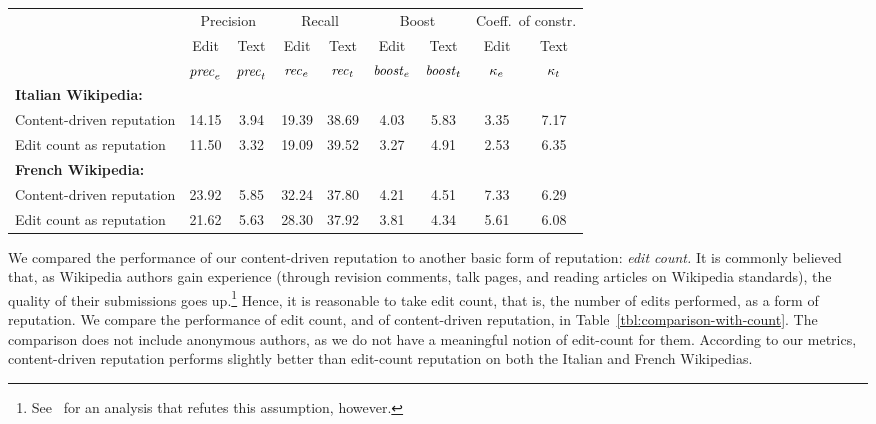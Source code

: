 \begin{sidewaystable}
\begin{center}
\begin{tabular}{|l||c|c||c|c||c|c||c|c|} \hline
 & \multicolumn{2}{|c||}{Precision}
 & \multicolumn{2}{|c||}{Recall}
 & \multicolumn{2}{|c||}{Boost}
 & \multicolumn{2}{|c|}{Coeff.\ of constr.} \\
 & Edit & Text & Edit & Text  & Edit & Text & Edit & Text \\
 & ${\text{\textit{prec}}}_e$ & ${\text{\textit{prec}}}_t$ & ${\text{\textit{rec}}}_e$ & ${\text{\textit{rec}}}_t$ & ${\text{\textit{boost}}}_e$ & ${\text{\textit{boost}}}_t$
 & $\kappa_e$ & $\kappa_t$ \\[0.5ex] \hline
\textbf{Italian Wikipedia:} & & & & & & & & \\
\qquad Content-driven reputation & 14.15 &  3.94 & 19.39 & 38.69 & 4.03 & 5.83 & 3.35 & 7.17 \\
\qquad Edit count as reputation  & 11.50 &  3.32 & 19.09 & 39.52 & 3.27 & 4.91 & 2.53 & 6.35 \\ \hline
\textbf{French Wikipedia:} & & & & & & & & \\
\qquad Content-driven reputation & 23.92 &  5.85 & 32.24 & 37.80 & 4.21 & 4.51 & 7.33 & 6.29 \\
\qquad Edit count as reputation &  21.62 &  5.63 & 28.30 & 37.92 & 3.81 & 4.34 & 5.61 & 6.08 \\ \hline
\end{tabular}
\end{center}
\caption[Performance of WikiTrust compared to edit count]
  {Summary of the performance of content-driven reputation over
  the Italian and French Wikipedias. All data are expressed as
  percentages. Anonymous authors are not included in the comparison.
  Precision is the probability that the text or edit longevity is low,
  given that the reputation is low.
  Recall is the probability that the reputation is low, given
  that the text or edit longevity is low.}
\label{tbl:comparison-with-count}
\end{sidewaystable}

We compared the performance of our content-driven reputation to
another basic form of reputation: {\em edit count.}
It is commonly believed that, as Wikipedia authors gain experience
(through revision comments, talk pages, and reading articles on
Wikipedia standards), the quality of their submissions goes
up.\footnote{See~\cite{Halfaker2011} for an analysis that refutes
this assumption, however.}
Hence, it is reasonable to take edit count, that is, the number of
edits performed, as a form of reputation.
We compare the performance of edit count, and of content-driven
reputation, in Table~\ref{tbl:comparison-with-count}.
The comparison does not include anonymous authors, as we do not have a
meaningful notion of edit-count for them.
According to our metrics, content-driven reputation
performs slightly better than edit-count reputation on both the Italian
and French Wikipedias.

